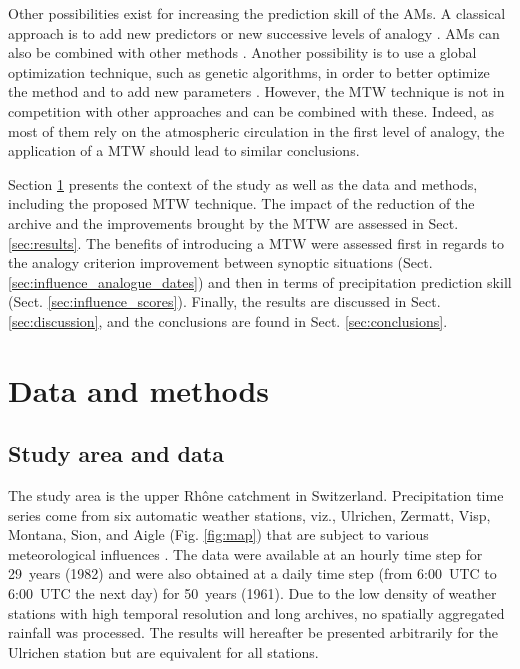 \documentclass[hess, manuscript]{copernicus}
\begin{document}
	Other possibilities exist for increasing the prediction skill of the AMs. A classical approach is to add new predictors or new successive levels of analogy \citep[see e.g.][]{Horton2012a, BenDaoud2016, Caillouet2016}. AMs can also be combined with other methods \citep[see e.g.][]{Chardon2014}. Another possibility is to use a global optimization technique, such as genetic algorithms, in order to better optimize the method and to add new parameters \citep{Horton2016}. However, the MTW technique is not in competition with other approaches and can be combined with these. Indeed, as most of them rely on the atmospheric circulation in the first level of analogy, the application of a MTW should lead to similar conclusions.
	
	Section \ref{sec:data_methods} presents the context of the study as well as the data and methods, including the proposed MTW technique. The impact of the reduction of the archive and the improvements brought by the MTW are assessed in Sect. \ref{sec:results}. The benefits of introducing a MTW were assessed first in regards to the analogy criterion improvement between synoptic situations (Sect. \ref{sec:influence_analogue_dates}) and then in terms of precipitation prediction skill (Sect. \ref{sec:influence_scores}). Finally, the results are discussed in Sect. \ref{sec:discussion}, and the conclusions are found in Sect. \ref{sec:conclusions}.
	
	
	\section{Data and methods}
	\label{sec:data_methods}
	
	\subsection{Study area and data}
	\label{sec:data}
	
	The study area is the upper Rh\^{o}ne catchment in Switzerland. Precipitation time series come from six automatic weather stations, viz., Ulrichen, Zermatt, Visp, Montana, Sion, and Aigle (Fig. \ref{fig:map}) that are subject to various meteorological influences \citep{Horton2012}. The data were available at an hourly time step for 29~years (1982) and were also obtained at a daily time step (from 6:00~UTC to 6:00~UTC the next day) for 50~years (1961). Due to the low density of weather stations with high temporal resolution and long archives, no spatially aggregated rainfall was processed. The results will hereafter be presented arbitrarily for the Ulrichen station but are equivalent for all stations.
	
\end{document}
